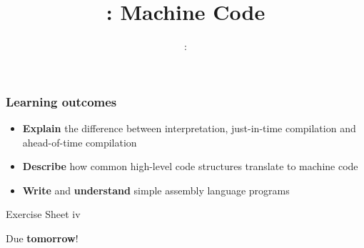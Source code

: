 \usepackage{../../beamerthemeFalmouthGamesAcademy}
\usepackage{multimedia}
\graphicspath{ {../../} }

\usepackage{mips}

\usepackage[normalem]{ulem}
\usepackage{wasysym}

\usepackage{pdfpages}

\usetikzlibrary{arrows,automata}




\title{\sessionnumber: Machine Code}
\subtitle{\modulecode: \moduletitle}

\frame{\titlepage} 

\begin{frame}
	\frametitle{Learning outcomes}
	\begin{itemize}
		\item \textbf{Explain} the difference between interpretation, just-in-time compilation and ahead-of-time compilation
		\item \textbf{Describe} how common high-level code structures translate to machine code
		\item \textbf{Write} and \textbf{understand} simple assembly language programs
	\end{itemize}
\end{frame}

\begin{frame}{Exercise Sheet iv}
	\begin{center}
		Due \textbf{tomorrow}!
	\end{center}
\end{frame}







